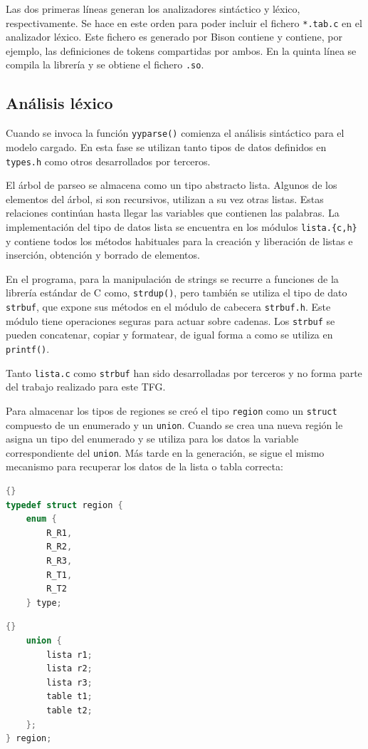 Las dos primeras líneas generan los analizadores sintáctico y léxico, respectivamente. Se hace en este orden para poder incluir el fichero \verb|*.tab.c| en el analizador léxico. Este fichero es generado por Bison contiene y contiene, por ejemplo, las definiciones de tokens compartidas por ambos. En la quinta línea se compila la librería y se obtiene el fichero \verb|.so|.

\subsection{Análisis léxico}

Cuando se invoca la función \verb|yyparse()| comienza el análisis sintáctico para el modelo cargado. En esta fase se utilizan tanto tipos de datos definidos en \verb|types.h| como otros desarrollados por terceros. 

El árbol de parseo se almacena como un tipo abstracto lista. Algunos de los elementos del árbol, si son recursivos, utilizan a su vez otras listas. Estas relaciones continúan hasta llegar las variables que contienen las palabras. La implementación del tipo de datos lista se encuentra en los módulos \verb|lista.{c,h}| y contiene todos los métodos habituales para la creación y liberación de listas e inserción, obtención y borrado de elementos. 

En el programa, para la manipulación de strings se recurre a funciones de la librería estándar de C como, \verb|strdup()|, pero también se utiliza el tipo de dato \verb|strbuf|, que expone sus métodos en el módulo de cabecera \verb|strbuf.h|. Este módulo tiene operaciones seguras para actuar sobre cadenas. Los \verb|strbuf| se pueden concatenar, copiar y formatear, de igual forma a como se utiliza en \verb|printf()|.

Tanto \verb|lista.c| como \verb|strbuf| han sido desarrolladas por terceros y no forma parte del trabajo realizado para este TFG.

Para almacenar los tipos de regiones se creó el tipo \verb|region| como un \verb|struct| compuesto de un enumerado y un \verb|union|. Cuando se crea una nueva región le asigna un tipo del enumerado y se utiliza para los datos la variable correspondiente del \verb|union|. Más tarde en la generación, se sigue el mismo mecanismo para recuperar los datos de la lista o tabla correcta:

\noindent\begin{minipage}{.45\textwidth}
    \begin{lstlisting}[language=C,caption={},frame=tlrb,label={}]{}
typedef struct region {
    enum {
        R_R1,
        R_R2,
        R_R3,
        R_T1,
        R_T2
    } type;
    \end{lstlisting}
\end{minipage}\hfill
\begin{minipage}{.45\textwidth}
    \begin{lstlisting}[language=C,caption={},frame=tlrb,label={}]{}
    union {
        lista r1;
        lista r2;
        lista r3;
        table t1;
        table t2;
    };
} region;
    \end{lstlisting}
\end{minipage}

